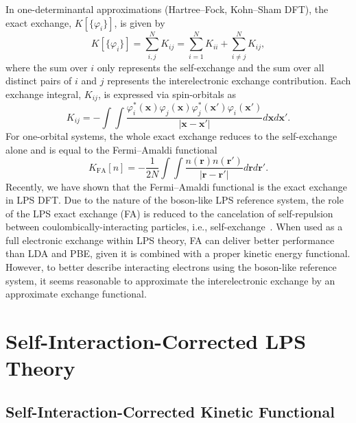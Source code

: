 \documentclass[%
 reprint,
 amsmath,amssymb,
 aps,
pra,
]{revtex4-2}
\begin{document}
In one-determinantal approximations (Hartree--Fock, Kohn--Sham DFT), the exact exchange, $K[\{\varphi_i\}]$, is given by
\begin{equation}
    K[\{\varphi_i\}]
    =
    \sum^N_{i,j}
    K_{ij}
    =
    \sum^N_{i=1}
    K_{ii}
    +
    \sum^N_{i\neq j}
    K_{ij},
\end{equation}
where the sum over $i$ only represents the self-exchange and the sum over all distinct pairs of $i$ and $j$ represents the interelectronic exchange contribution.
Each exchange integral, $K_{ij}$, is expressed via spin-orbitals as
\begin{equation}
    K_{ij}
    =
    -
    \int\int
    \frac{\varphi_i^*(\textbf{x})\varphi_j(\textbf{x})
          \varphi_j^*(\textbf{x}')\varphi_i(\textbf{x}')}
          {|\textbf{x}-\textbf{x}'|}
    d\textbf{x}d\textbf{x}'.
\end{equation} 
For one-orbital systems, the whole exact exchange reduces to the self-exchange alone and is equal to the Fermi--Amaldi functional
\begin{equation}
    K_{\text{FA}}[n]
    =
    -
    \frac{1}{2N}
    \int\int
    \frac{n(\textbf{r})n(\textbf{r}')}
    {|\textbf{r}-\textbf{r}'|}
    d\textbf{r}d\textbf{r}'.
\end{equation}
Recently, we have shown that the Fermi--Amaldi functional is the exact exchange in LPS DFT. Due to the nature of the boson-like LPS reference system, the role of the LPS exact exchange (FA) is reduced to the cancelation of self-repulsion between coulombically-interacting particles, i.e., self-exchange~\cite{Bosko.2023.PRA.108.052803}. When used as a full electronic exchange within LPS theory, FA can deliver better performance than LDA and PBE, given it is combined with a proper kinetic energy functional. However, to better describe interacting electrons using the boson-like reference system, it seems reasonable to approximate the interelectronic exchange by an approximate exchange functional.

\section{Self-Interaction-Corrected LPS Theory}

\subsection{Self-Interaction-Corrected Kinetic Functional}
\end{document}
